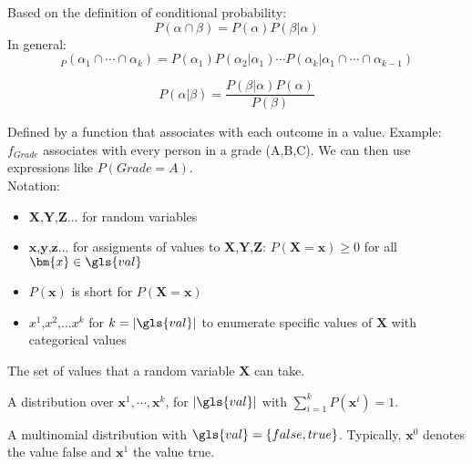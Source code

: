 {%
  Based on the definition of \gls{conditional probability}:
  \begin{equation*}
    P(\alpha\cap\beta)=P(\alpha)P(\beta|\alpha)
  \end{equation*}
  In general:
  \begin{equation*}
    _P(\alpha_1\cap\cdots\cap\alpha_k)=P(\alpha_1)P(\alpha_2|\alpha_1)\cdots P(\alpha_k|\alpha_1\cap\cdots\cap\alpha_{k-1})
  \end{equation*}
}

{%
  \begin{equation*}
    P(\alpha|\beta)=\frac{P(\beta|\alpha)P(\alpha)}{P(\beta)}
  \end{equation*}
}

{%
  Defined by a function that associates with each outcome in  a value. Example: $f_{Grade}$ associates with every person in  a grade (A,B,C). We can then use expressions like $P(Grade=A)$.\\

  Notation:
  \begin{itemize}
    \item  $\bm{X}$,$\bm{Y}$,$\bm{Z}$... for random variables
    \item  $\bm{x}$,$\bm{y}$,$\bm{z}$... for assigments of values to  $\bm{X}$,$\bm{Y}$,$\bm{Z}$: $P(\bm{X}=\bm{x})\geq0 $ for all $\bm{x}\in \gls{val}$
    \item  $P(\bm{x})$ is short for $P(\bm{X}=\bm{x})$
    \item  $x^1$,$x^2$,...$x^k$ for $k=|\gls{val}|$ to enumerate specific values of $\bm{X}$ with categorical values
  \end{itemize}
}

{%
  The set of values that a \gls{random variable} $\bm{X}$ can take.
}

{%
  A distribution over $\bm{x}^1,\cdots,\bm{x}^k$, for $|\gls{val}|$ with $\sum_{i=1}^k P(\bm{x}^i)=1$.
}

{%
  A \gls{multinomial distribution} with $\gls{val}=\{false,true\}$. Typically, $\bm{x}^0$ denotes the value false and $\bm{x}^1$ the value true.
}

